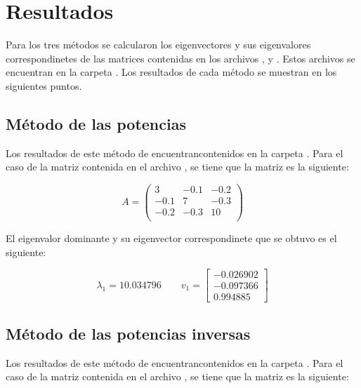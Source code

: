 \section{Resultados}

Para los tres métodos se calcularon los eigenvectores y sus eigenvalores correspondinetes de las matrices contenidas en los archivos ,  y . Estos archivos se encuentran en la carpeta . Los resultados de cada método se muestran en los siguientes puntos.

\subsection{Método de las potencias \label{sec:power_results}}

Los resultados de este método de encuentrancontenidos en la carpeta . Para el caso de la matriz contenida en el archivo , se tiene que la matriz es la siguiente:

\begin{equation*}
    A= \begin{pmatrix}
        3    & -0.1 & -0.2 \\
        -0.1 & 7    & -0.3 \\
        -0.2 & -0.3 & 10   \\
    \end{pmatrix}
\end{equation*}

El eigenvalor dominante y su eigenvector correspondinete que se obtuvo es el siguiente:

\begin{equation*}
    \lambda_1 = 10.034796 \qquad v_1 =
    \begin{bmatrix}
        -0.026902 \\	-0.097366\\	0.994885
    \end{bmatrix}
\end{equation*}

\subsection{Método de las potencias inversas}

Los resultados de este método de encuentrancontenidos en la carpeta . Para el caso de la matriz contenida en el archivo , se tiene que la matriz es la siguiente:

